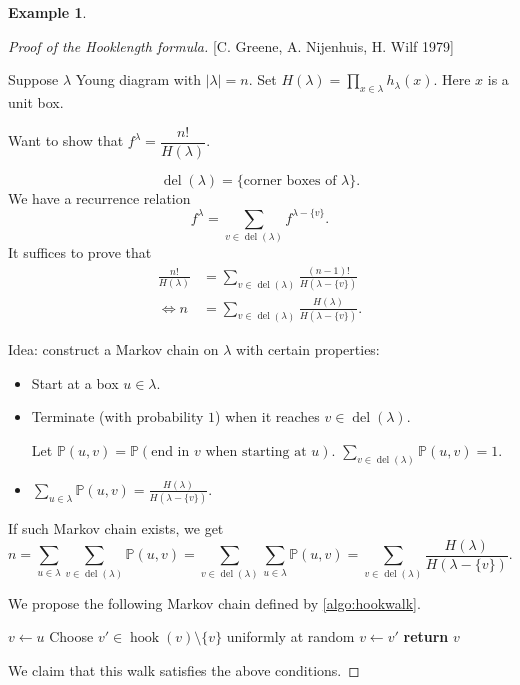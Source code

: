 \documentclass{report}
\newcommand{\matP}{\mathbb{P}}
\def \del {\operatorname{del}}
\theoremstyle{definition}
\newtheorem{example}{Example}[section]
\theoremstyle{remark}
\numberwithin{equation}{section}
\begin{document}
\begin{example}
    
\end{example}

\begin{proof}[Proof of the Hooklength formula]
[C. Greene, A. Nijenhuis, H. Wilf 1979]

Suppose $\lambda$ Young diagram with $|\lambda| = n$.
Set $H(\lambda) = \prod_{x \in \lambda}h_\lambda(x)$. Here $x$ is a unit box. 

Want to show that $f^\lambda = \dfrac{n!}{H(\lambda)}$.

\[\del(\lambda) = \{\text{corner boxes of } \lambda\}.\]
We have a recurrence relation\[
    f^\lambda = \sum_{v \in \del(\lambda)} f^{\lambda - \{v\}}.
\]
It suffices to prove that \begin{align*}
    \frac{n!}{H(\lambda)} & = \sum_{v \in \del(\lambda)} \frac{(n-1)!}{H(\lambda - \{v\})} \\
    \iff n & = \sum_{v \in \del(\lambda)} \frac{H(\lambda)}{H(\lambda - \{v\})}. 
\end{align*}

Idea: construct a Markov chain on $\lambda$ with certain properties: \begin{itemize}
    \item Start at a box $u \in \lambda$.
    \item Terminate (with probability $1$) when it reaches $v \in \del(\lambda)$.
    
    Let $\matP(u, v) = \matP(\text{end in $v$ when starting at $u$})$. $\sum_{v \in \del(\lambda)} \matP(u, v) = 1$. 
    \item $\displaystyle \sum_{u \in \lambda}\matP(u, v) = \frac{H(\lambda)}{H(\lambda - \{v\})}$.
\end{itemize}
If such Markov chain exists, we get \[
    n = \sum_{u \in \lambda} \sum_{v \in \del(\lambda)}\matP(u, v) = \sum_{v \in \del(\lambda)}\sum_{u \in \lambda} \matP(u, v) = \sum_{v \in \del(\lambda)} \frac{H(\lambda)}{H(\lambda - \{v\})}.
\]

We propose the following Markov chain defined by \autoref{algo:hookwalk}.
\begin{algorithm}[h]
    \caption{The Hook Walk}
    \label{algo:hookwalk}
    \begin{algorithmic}[1]
            \State $v \gets u$
            \While{$v \notin \del(\lambda)$} 
                \State Choose $v' \in \operatorname{hook}(v) \setminus \{v\}$ uniformly at random
                \State $v \gets v'$
            \EndWhile
            \State \textbf{return} $v$
        \EndFunction
    \end{algorithmic}
\end{algorithm}
We claim that this walk satisfies the above conditions.


\end{proof}
\end{document}
